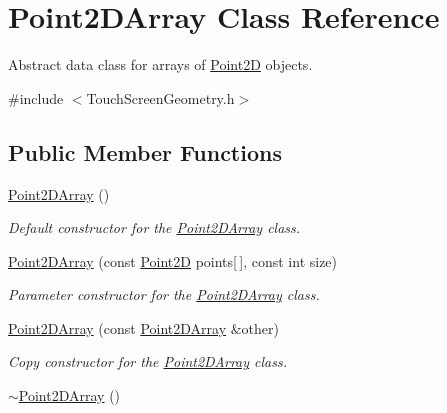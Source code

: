 \hypertarget{class_point2_d_array}{\section{Point2\+D\+Array Class Reference}
\label{class_point2_d_array}
}


Abstract data class for arrays of \hyperlink{class_point2_d}{Point2\+D} objects.  




{\ttfamily \#include $<$Touch\+Screen\+Geometry.\+h$>$}

\subsection*{Public Member Functions}
\begin{DoxyCompactItemize}
\item 
\hypertarget{class_point2_d_array_a3852568a5991f49f357ce5d341fda341}{\hyperlink{class_point2_d_array_a3852568a5991f49f357ce5d341fda341}{Point2\+D\+Array} ()}\label{class_point2_d_array_a3852568a5991f49f357ce5d341fda341}

\begin{DoxyCompactList}\small\item\em Default constructor for the \hyperlink{class_point2_d_array}{Point2\+D\+Array} class. \end{DoxyCompactList}\item 
\hypertarget{class_point2_d_array_a4bbfa9fe66703b289abfba1337e7e412}{\hyperlink{class_point2_d_array_a4bbfa9fe66703b289abfba1337e7e412}{Point2\+D\+Array} (const \hyperlink{class_point2_d}{Point2\+D} points\mbox{[}$\,$\mbox{]}, const int size)}\label{class_point2_d_array_a4bbfa9fe66703b289abfba1337e7e412}

\begin{DoxyCompactList}\small\item\em Parameter constructor for the \hyperlink{class_point2_d_array}{Point2\+D\+Array} class. \end{DoxyCompactList}\item 
\hyperlink{class_point2_d_array_ae6a3c36e20971e81eb56c280d6ed31bc}{Point2\+D\+Array} (const \hyperlink{class_point2_d_array}{Point2\+D\+Array} \&other)
\begin{DoxyCompactList}\small\item\em Copy constructor for the \hyperlink{class_point2_d_array}{Point2\+D\+Array} class. \end{DoxyCompactList}\item 
\hypertarget{class_point2_d_array_a2dfe3639c75b45da42925e10d6895ba1}{\hyperlink{class_point2_d_array_a2dfe3639c75b45da42925e10d6895ba1}{$\sim$\+Point2\+D\+Array} ()}\label{class_point2_d_array_a2dfe3639c75b45da42925e10d6895ba1}


\end{DoxyCompactItemize}
